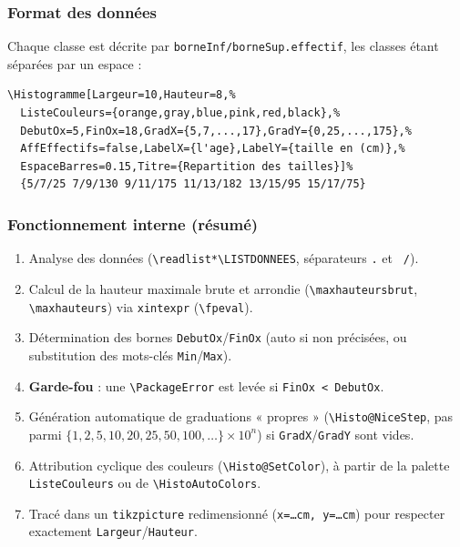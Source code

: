 \documentclass[11pt,a4paper]{article}
\newcommand{\cmdname}[1]{\texttt{\textbackslash#1}}
\begin{document}
\subsubsection{Format des données}

Chaque classe est décrite par \texttt{borneInf/borneSup.effectif}, les classes étant séparées par un espace :

\begin{lstlisting}
\Histogramme[Largeur=10,Hauteur=8,%
  ListeCouleurs={orange,gray,blue,pink,red,black},%
  DebutOx=5,FinOx=18,GradX={5,7,...,17},GradY={0,25,...,175},%
  AffEffectifs=false,LabelX={l'age},LabelY={taille en (cm)},%
  EspaceBarres=0.15,Titre={Repartition des tailles}]%
  {5/7/25 7/9/130 9/11/175 11/13/182 13/15/95 15/17/75}
\end{lstlisting}

\subsubsection{Fonctionnement interne (résumé)}

\begin{enumerate}
  \item Analyse des données (\texttt{\textbackslash readlist*\textbackslash LISTDONNEES}, séparateurs \texttt{.} et \texttt{ /}).
  \item Calcul de la hauteur maximale brute et arrondie (\texttt{\textbackslash maxhauteursbrut}, \texttt{\textbackslash maxhauteurs}) via \texttt{xintexpr} (\cmdname{fpeval}).
  \item Détermination des bornes \texttt{DebutOx}/\texttt{FinOx} (auto si non précisées, ou substitution des mots-clés \texttt{Min}/\texttt{Max}).
  \item \textbf{Garde-fou} : une \texttt{\textbackslash PackageError} est levée si \texttt{FinOx < DebutOx}.
  \item Génération automatique de graduations « propres » (\texttt{\textbackslash Histo@NiceStep}, pas parmi $\{1,2,5,10,20,25,50,100,\dots\}\times 10^n$) si \texttt{GradX}/\texttt{GradY} sont vides.
  \item Attribution cyclique des couleurs (\texttt{\textbackslash Histo@SetColor}), à partir de la palette \texttt{ListeCouleurs} ou de \texttt{\textbackslash HistoAutoColors}.
  \item Tracé dans un \texttt{tikzpicture} redimensionné (\texttt{x=\dots cm, y=\dots cm}) pour respecter exactement \texttt{Largeur}/\texttt{Hauteur}.
\end{enumerate}
\end{document}
